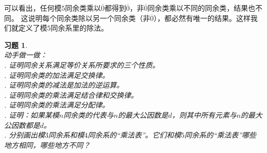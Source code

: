 \documentclass[12pt,UTF8]{ctexbook}
\newtheorem{xt}{习题}[section]
\begin{document}
可以看出，任何模$5$同余类乘以$\overline{0}$都得到$\overline{0}$，非$\overline{0}$同余类乘以不同的同余类，结果也不同。
这说明每个同余类除以另一个同余类（非$\overline{0}$），都必然有唯一的结果。这样我们就定义了模$5$同余系里的除法。

\begin{xt}\label{xt:3-0-0}
    \mbox{}\\
    动手做一做：\\
    . 证明同余关系满足等价关系所要求的三个性质。 \\
    . 证明同余类的加法满足交换律。 \\
    . 证明同余类的减法是加法的逆运算。\\
    . 证明同余类的乘法满足结合律和交换律。\\
    . 证明同余类的乘法满足分配律。\\
    . 证明：如果某模$n$同余类的代表与$n$的最大公因数是$d$，则其中所有元素与$n$的最大公因数都是$d$。\\
    . 分别画出模$3$同余系和模$4$同余系的“乘法表”。它们和模$5$同余系的“乘法表”哪些地方相同，哪些地方不同？
\end{xt}
\end{document}
